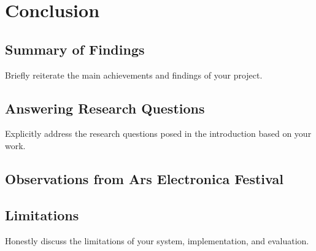 \chapter{Conclusion}
    \section{Summary of Findings} Briefly reiterate the main achievements and findings of your project.
    \section{Answering Research Questions} Explicitly address the research questions posed in the introduction based on your work.
    \section{Observations from Ars Electronica Festival} 
    \section{Limitations} Honestly discuss the limitations of your system, implementation, and evaluation.
